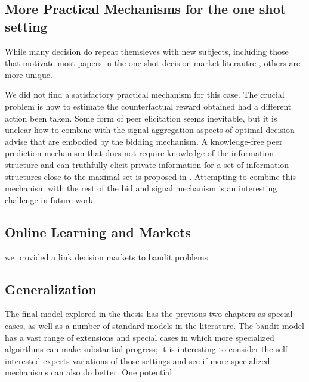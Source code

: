 

\subsection{More Practical Mechanisms for the one shot setting}
While many decision do repeat themsleves with new subjects, including those that motivate most papers in the one shot decision market literautre , others are more unique. 

We did not find a satisfactory practical mechanism for this case.
The crucial problem is how to estimate the counterfactual reward obtained had a different action been taken.
Some form of peer elicitation seems inevitable, but it is unclear how to combine with the signal aggregation aspects of optimal decision advise that are embodied by the bidding mechanism. 
A knowledge-free peer prediction mechanism that does not require knowledge of the information structure and
can truthfully elicit private information for a set of information structures close to the maximal set is proposed in \cite{zhang2014elicitability}. 
Attempting to combine this mechanism with the rest of the bid and signal mechanism is an interesting challenge in future work. 

\subsection{Online Learning and Markets}

we provided a link decision markets to bandit problems



\subsection{Generalization}

The final model explored in the thesis has the previous two chapters as special cases, as well as a number of standard models in the literature.
The bandit model has a vast range of extensions and special cases in which more specialized algoirthms can make substantial progress; it is interesting to consider the self-interested experts variations of those settings and see if more specialized mechanisms can also do better.
One potential 



